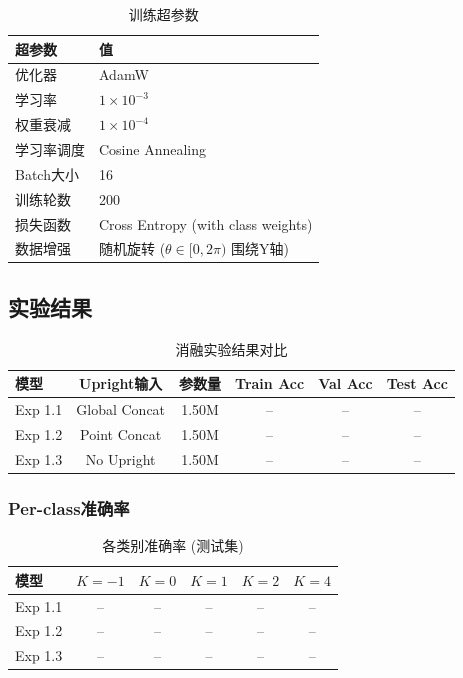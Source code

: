 \begin{table}[h]
\centering
\caption{训练超参数}
\label{tab:training_params}
\begin{tabular}{ll}
\hline
\textbf{超参数} & \textbf{值} \\
\hline
优化器 & AdamW \\
学习率 & $1 \times 10^{-3}$ \\
权重衰减 & $1 \times 10^{-4}$ \\
学习率调度 & Cosine Annealing \\
Batch大小 & 16 \\
训练轮数 & 200 \\
损失函数 & Cross Entropy (with class weights) \\
数据增强 & 随机旋转 ($\theta \in [0, 2\pi)$ 围绕Y轴) \\
\hline
\end{tabular}
\end{table}

\subsection{实验结果}

\begin{table}[h]
\centering
\caption{消融实验结果对比}
\label{tab:ablation_results}
\begin{tabular}{lccccc}
\hline
\textbf{模型} & \textbf{Upright输入} & \textbf{参数量} & \textbf{Train Acc} & \textbf{Val Acc} & \textbf{Test Acc} \\
\hline
Exp 1.1 & Global Concat & 1.50M & -- & -- & -- \\
Exp 1.2 & Point Concat & 1.50M & -- & -- & -- \\
Exp 1.3 & No Upright & 1.50M & -- & -- & -- \\
\hline
\end{tabular}
\end{table}

\subsubsection{Per-class准确率}

\begin{table}[h]
\centering
\caption{各类别准确率 (测试集)}
\label{tab:per_class_accuracy}
\begin{tabular}{lccccc}
\hline
\textbf{模型} & $K=-1$ & $K=0$ & $K=1$ & $K=2$ & $K=4$ \\
\hline
Exp 1.1 & -- & -- & -- & -- & -- \\
Exp 1.2 & -- & -- & -- & -- & -- \\
Exp 1.3 & -- & -- & -- & -- & -- \\
\hline
\end{tabular}
\end{table}

